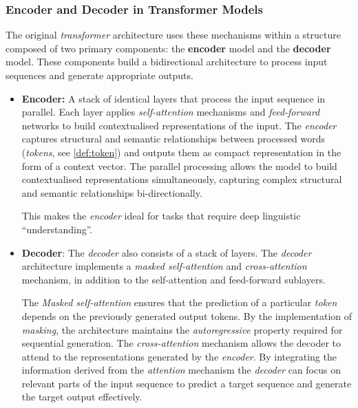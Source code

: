 \subsubsection[Encoder-Decoder]{Encoder and Decoder in Transformer Models}\label{subsub:encoder_decoder_prel}
The original \textit{transformer} architecture uses these mechanisms within a structure composed of two primary components: the \textbf{encoder} model and the \textbf{decoder} model.
These components build a bidirectional architecture to process input sequences and generate appropriate outputs.
\begin{itemize}
    \item \textbf{Encoder:} A stack of identical layers that process the input sequence in parallel.
    Each layer applies \textit{self-attention} mechanisms and \textit{feed-forward} networks to build contextualised representations of the input.
    The \textit{encoder} captures structural and semantic relationships between processed words (\textit{tokens}, see \cref{def:token}) and outputs them as compact representation in the form of a context vector.
    The parallel processing allows the model to build contextualised representations simultaneously, capturing complex structural and semantic relationships bi-directionally.
    
    This makes the \textit{encoder} ideal for tasks that require deep linguistic \enquote{understanding}.
    \item \textbf{Decoder}: 
    The \textit{decoder} also consists of a stack of layers.
    The \textit{decoder} architecture implements a \textit{masked self-attention} and \textit{cross-attention} mechanism, in addition to the self-attention and feed-forward sublayers.
    
    The \textit{Masked self-attention} ensures that the prediction of a particular \textit{token} depends on the previously generated output tokens.
    By the implementation of \textit{masking}, the architecture maintains the \textit{autoregressive} property required for sequential generation.
    The \textit{cross-attention} mechanism allows the decoder to attend to the representations generated by the \textit{encoder}. 
    By integrating the information derived from the \textit{attention} mechanism the \textit{decoder} can focus on relevant parts of the input sequence to predict a target sequence and generate the target output effectively.
\end{itemize}
%
